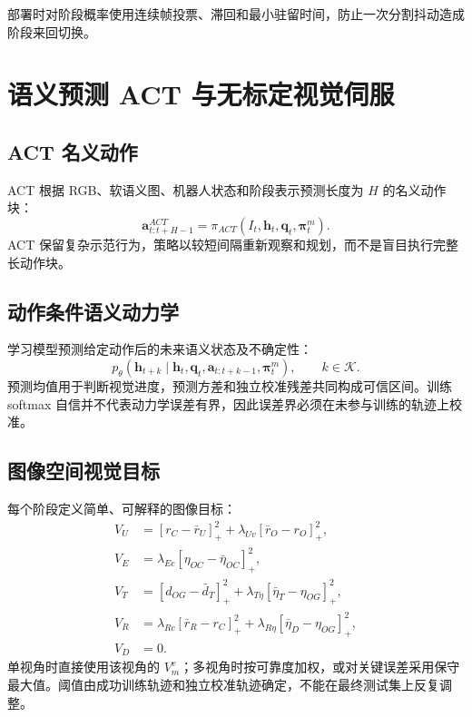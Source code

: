 \documentclass[UTF8,a4paper,11pt]{ctexart}
\newcommand{\pos}[1]{\left[#1\right]_{+}}
\begin{document}
部署时对阶段概率使用连续帧投票、滞回和最小驻留时间，防止一次分割抖动造成阶段来回切换。

\section{语义预测 ACT 与无标定视觉伺服}

\subsection{ACT 名义动作}

ACT 根据 RGB、软语义图、机器人状态和阶段表示预测长度为 $H$ 的名义动作块\cite{zhao2023act}：
\begin{equation}
\bm a_{t:t+H-1}^{ACT}=\pi_{ACT}(I_t,\bm h_t,\bm q_t,\bm\pi_t^m).
\end{equation}
ACT 保留复杂示范行为，策略以较短间隔重新观察和规划，而不是盲目执行完整长动作块。

\subsection{动作条件语义动力学}

学习模型预测给定动作后的未来语义状态及不确定性：
\begin{equation}
p_\theta\left(
\bm h_{t+k}\mid \bm h_t,\bm q_t,
\bm a_{t:t+k-1},\bm\pi_t^m
\right),\qquad k\in\mathcal K.
\end{equation}
预测均值用于判断视觉进度，预测方差和独立校准残差共同构成可信区间。训练 softmax 自信并不代表动力学误差有界，因此误差界必须在未参与训练的轨迹上校准。

\subsection{图像空间视觉目标}

每个阶段定义简单、可解释的图像目标：
\begin{align}
V_U &= \pos{r_C-\bar r_U}^2+\lambda_{Uv}\pos{\bar r_O-r_O}^2,\\
V_E &= \lambda_{Ec}\pos{\eta_{OC}-\bar\eta_{OC}}^2,\\
V_T &= \pos{d_{OG}-\bar d_T}^2+
       \lambda_{T\eta}\pos{\bar\eta_T-\eta_{OG}}^2,\\
V_R &= \lambda_{Rc}\pos{\bar r_R-r_C}^2+
       \lambda_{R\eta}\pos{\bar\eta_D-\eta_{OG}}^2,\\
V_D &= 0.
\end{align}
单视角时直接使用该视角的 $V_m^v$；多视角时按可靠度加权，或对关键误差采用保守最大值。阈值由成功训练轨迹和独立校准轨迹确定，不能在最终测试集上反复调整。
\end{document}

